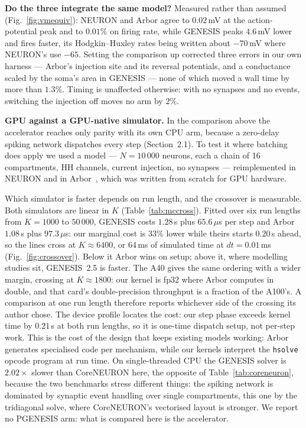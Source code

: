 \documentclass[preprint,12pt, a4paper]{elsarticle}
\begin{document}
\begin{enumerate}
\textbf{Do the three integrate the same model?} Measured rather than assumed (Fig.~\ref{fig:vmequiv}): NEURON and Arbor agree to $0.02$\,mV at the action-potential peak and to $0.01\%$ on firing rate, while GENESIS peaks $4.6$\,mV lower and fires faster, its Hodgkin--Huxley rates being written about $-70$\,mV where NEURON's use $-65$. Setting the comparison up corrected three errors in our own harness --- Arbor's injection site and its reversal potentials, and a conductance scaled by the soma's area in GENESIS --- none of which moved a wall time by more than $1.3\%$. Timing is unaffected otherwise: with no synapses and no events, switching the injection off moves no arm by $2\%$.

\textbf{GPU against a GPU-native simulator.} In the comparison above the accelerator reaches only parity with its own CPU arm, because a zero-delay spiking network dispatches every step (Section~2.1). To test it where batching does apply we used a model --- $N=10\,000$ neurons, each a chain of 16 compartments, HH channels, current injection, no synapses --- reimplemented in NEURON and in Arbor~\cite{arbor2019}, which was written from scratch for GPU hardware.

Which simulator is faster depends on run length, and the crossover is measurable. Both simulators are linear in $K$ (Table~\ref{tab:mccross}). Fitted over six run lengths from $K=1000$ to $50\,000$, GENESIS costs $1.28$\,s plus $65.6\,\mu$s per step and Arbor $1.08$\,s plus $97.3\,\mu$s: our marginal cost is $33\%$ lower while theirs starts $0.20$\,s ahead, so the lines cross at $K\approx6400$, or 64\,ms of simulated time at $dt=0.01$\,ms (Fig.~\ref{fig:crossover}). Below it Arbor wins on setup; above it, where modelling studies sit, GENESIS~2.5 is faster. The A40 gives the same ordering with a wider margin, crossing at $K\approx1800$: our kernel is fp32 where Arbor computes in double, and that card's double-precision throughput is a fraction of the A100's. A comparison at one run length therefore reports whichever side of the crossing its author chose. The device profile locates the cost: our step phase exceeds kernel time by $0.21$\,s at both run lengths, so it is one-time dispatch setup, not per-step work. This is the cost of the design that keeps existing models working: Arbor generates specialised code per mechanism, while our kernels interpret the \texttt{hsolve} opcode program at run time. On single-threaded CPU the GENESIS solver is $2.02\times$ slower than CoreNEURON here, the opposite of Table~\ref{tab:coreneuron}, because the two benchmarks stress different things: the spiking network is dominated by synaptic event handling over single compartments, this one by the tridiagonal solve, where CoreNEURON's vectorised layout is stronger. We report no PGENESIS arm: what is compared here is the accelerator.


\end{enumerate}
\end{document}
